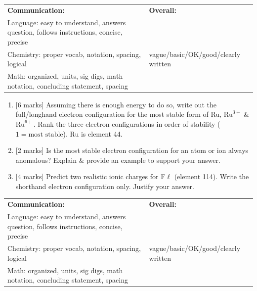 \documentclass[11pt]{article}
\newcommand{\headerbox}{
    \noindent\begin{tabular}{|p{11cm}|p{5.5cm}|}
    \hline
    \scriptsize \textbf{Communication:} & \scriptsize \textbf{Overall:}\\
    \scriptsize Language: easy to understand, answers question, follows instructions, concise, precise & \\
    \scriptsize Chemistry: proper vocab, notation, spacing, logical & \scriptsize \space\space \space\space vague/basic/OK/good/clearly written \\
    \scriptsize Math: organized, units, sig digs, math notation, concluding statement, spacing & \\
    \hline
    \end{tabular}
    \vspace{1em}
}
\begin{document}
\begin{enumerate}
\begin{center}
    \end{center}
    \vspace{3cm}
\end{enumerate}

\newpage
\vspace*{0pt}
\headerbox

\begin{enumerate}[resume]
    \item {[6 marks]} Assuming there is enough energy to do so, write out the full/longhand electron configuration for the most stable form of Ru, $\text{Ru}^{3+}$ \& $\text{Ru}^{6+}$. Rank the three electron configurations in order of stability ($1 = \text{most stable}$). Ru is element 44.
    \vspace{5cm}

    \item {[2 marks]} Is the most stable electron configuration for an atom or ion always anomalous? Explain \& provide an example to support your answer.
    \vspace{4cm}

    \item {[4 marks]} Predict two realistic ionic charges for F$\ell$ (element 114). Write the shorthand electron configuration only. Justify your answer.
    \vspace{5cm}
\end{enumerate}

\newpage
\vspace*{0pt}
\headerbox
\end{document}
